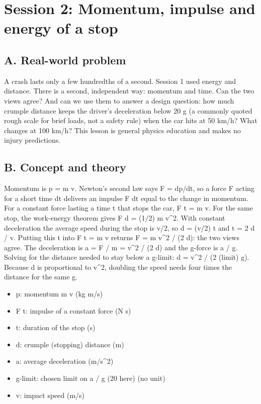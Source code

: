 \documentclass[11pt,a4paper]{article}
\begin{document}
\section{Session 2: Momentum, impulse and energy of a stop}

\subsection*{A. Real-world problem}
A crash lasts only a few hundredths of a second. Session 1 used energy and distance. There is a second, independent way: momentum and time. Can the two views agree? And can we use them to answer a design question: how much crumple distance keeps the driver's deceleration below 20 g (a commonly quoted rough scale for brief loads, not a safety rule) when the car hits at 50 km/h? What changes at 100 km/h? This lesson is general physics education and makes no injury predictions.

\subsection*{B. Concept and theory}
Momentum is p = m v. Newton's second law says F = dp/dt, so a force F acting for a short time dt delivers an impulse F dt equal to the change in momentum. For a constant force lasting a time t that stops the car, F t = m v. For the same stop, the work-energy theorem gives F d = (1/2) m v\textasciicircum{}2. With constant deceleration the average speed during the stop is v/2, so d = (v/2) t and t = 2 d / v. Putting this t into F t = m v returns F = m v\textasciicircum{}2 / (2 d): the two views agree. The deceleration is a = F / m = v\textasciicircum{}2 / (2 d) and the g-force is a / g. Solving for the distance needed to stay below a g-limit: d = v\textasciicircum{}2 / (2 (limit) g). Because d is proportional to v\textasciicircum{}2, doubling the speed needs four times the distance for the same g.

\begin{itemize}[nosep]
\item p: momentum m v (kg m/s)
\item F t: impulse of a constant force (N s)
\item t: duration of the stop (s)
\item d: crumple (stopping) distance (m)
\item a: average deceleration (m/s\textasciicircum{}2)
\item g-limit: chosen limit on a / g (20 here) (no unit)
\item v: impact speed (m/s)
\end{itemize}
\end{document}

